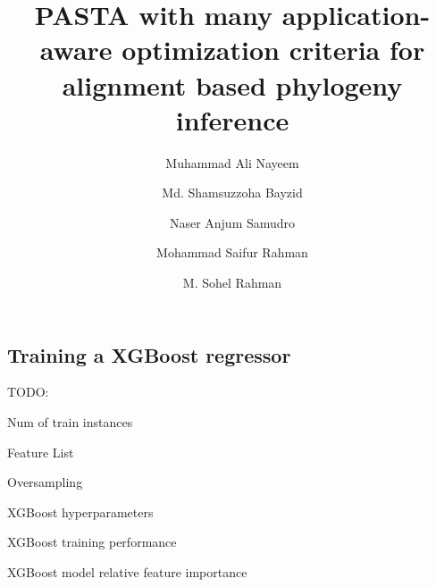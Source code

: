 \documentclass[unnumsec,webpdf,modern,large]{oup-authoring-template}
\theoremstyle{thmstyleone}%
\theoremstyle{thmstyletwo}%
\theoremstyle{thmstylethree}%
\begin{document}
\DOI{}
\copyrightyear{}
\pubyear{}
\access{}



\title[PASTA with many application-aware optimization criteria]{PASTA with many application-aware optimization criteria for alignment based phylogeny inference}

\author[1]{Muhammad Ali Nayeem}
\author[1]{Md. Shamsuzzoha Bayzid}
\author[1]{Naser Anjum Samudro}
\author[1]{Mohammad Saifur Rahman}
\author[1,$\ast$]{M. Sohel Rahman}


\address[1]{, , }









\maketitle

 




%
\begin{appendices}
	
	\section{Training a XGBoost regressor}\label{appendex:train}
	TODO:
	
	Num of train instances
	
	Feature List
	
	Oversampling
	
	XGBoost hyperparameters
	
	
	XGBoost training performance
	
	XGBoost model relative feature importance

\end{appendices}
\end{document}
